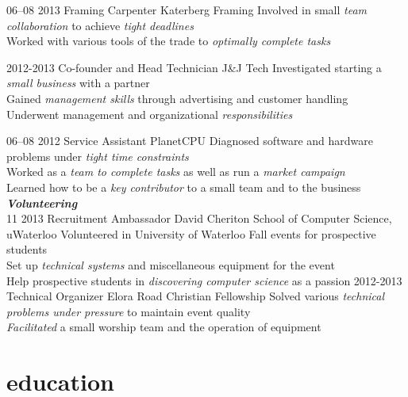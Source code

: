 \documentclass[]{friggeri-cv-short}
\newcommand{\imp}[1] {{\em #1}}
\begin{document}
\begin{entrylist}

  \entry
    {06–08 2013}
    {Framing Carpenter}
    {Katerberg Framing}
    {Involved in small \imp{team collaboration} to achieve \imp{tight deadlines} \\
    Worked with various tools of the trade to \imp{optimally complete tasks}  
   }

  \entry
  	{2012-2013}
  	{Co-founder and Head Technician}
  	{J\&J Tech}
  	{Investigated starting a \imp{small business} with a partner \\
	Gained \imp{management skills} through advertising and customer handling \\
	Underwent management and organizational \imp{responsibilities}}
	
  \entry
    {06–08 2012}
    {Service Assistant}
    {PlanetCPU}
    {Diagnosed software and hardware problems under \imp{tight time constraints} \\	Worked as a \imp{team to complete tasks} as well as run a \imp{market campaign} \\
    Learned how to be a \imp{key contributor} to a small team and to the business}
\textbf{\emph{Volunteering}} \\    
  \entry
  	{11 2013}
  	{Recruitment Ambassador}
  	{David Cheriton School of Computer Science, uWaterloo}
	{Volunteered in University of Waterloo Fall events for prospective students \\
  	Set up \imp{technical systems} and miscellaneous equipment for the event \\
	Help prospective students in \imp{discovering computer science} as a passion}
  \entry
  	{2012-2013}
  	{Technical Organizer}
  	{Elora Road Christian Fellowship}
	{Solved various \imp{technical problems under pressure} to maintain event quality\\
	\imp{Facilitated} a small worship team and the operation of equipment}
  	

\end{entrylist}

\newpage

\section{education}
\end{document}
